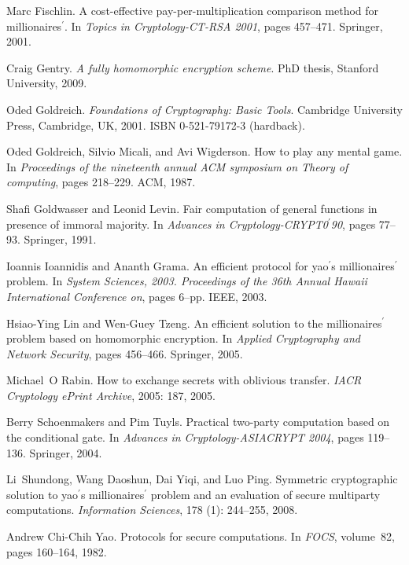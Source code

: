 \documentclass[11pt, letterpaper, romanappendices, onecolumn]{article}
\theoremstyle{plain}\newtheorem{thm}{Theorem}[section]
\theoremstyle{definition}
\theoremstyle{remark}
\begin{document}
\begin{thebibliography}{18}
Marc Fischlin.
\newblock A cost-effective pay-per-multiplication comparison method for
  millionaires$^\prime$.
\newblock In \emph{Topics in Cryptology-CT-RSA 2001}, pages 457--471. Springer,
  2001.

Craig Gentry.
\newblock \emph{A fully homomorphic encryption scheme}.
\newblock PhD thesis, Stanford University, 2009.

Oded Goldreich.
\newblock \emph{Foundations of Cryptography: Basic Tools}.
\newblock Cambridge University Press, Cambridge, UK, 2001.
\newblock ISBN 0-521-79172-3 (hardback).

Oded Goldreich, Silvio Micali, and Avi Wigderson.
\newblock How to play any mental game.
\newblock In \emph{Proceedings of the nineteenth annual ACM symposium on Theory
  of computing}, pages 218--229. ACM, 1987.

Shafi Goldwasser and Leonid Levin.
\newblock Fair computation of general functions in presence of immoral
  majority.
\newblock In \emph{Advances in Cryptology-CRYPT0$^\prime$90}, pages 77--93.
  Springer, 1991.

Ioannis Ioannidis and Ananth Grama.
\newblock An efficient protocol for yao$^\prime$s millionaires$^\prime$
  problem.
\newblock In \emph{System Sciences, 2003. Proceedings of the 36th Annual Hawaii
  International Conference on}, pages 6--pp. IEEE, 2003.

Hsiao-Ying Lin and Wen-Guey Tzeng.
\newblock An efficient solution to the millionaires$^\prime$ problem based on
  homomorphic encryption.
\newblock In \emph{Applied Cryptography and Network Security}, pages 456--466.
  Springer, 2005.

Michael~O Rabin.
\newblock How to exchange secrets with oblivious transfer.
\newblock \emph{IACR Cryptology ePrint Archive}, 2005: 187, 2005.

Berry Schoenmakers and Pim Tuyls.
\newblock Practical two-party computation based on the conditional gate.
\newblock In \emph{Advances in Cryptology-ASIACRYPT 2004}, pages 119--136.
  Springer, 2004.

Li~Shundong, Wang Daoshun, Dai Yiqi, and Luo Ping.
\newblock Symmetric cryptographic solution to yao$^\prime$s
  millionaires$^\prime$ problem and an evaluation of secure multiparty
  computations.
\newblock \emph{Information Sciences}, 178 (1): 244--255,
  2008.

Andrew Chi-Chih Yao.
\newblock Protocols for secure computations.
\newblock In \emph{FOCS}, volume~82, pages 160--164, 1982.

\end{thebibliography}
 
\end{document}

